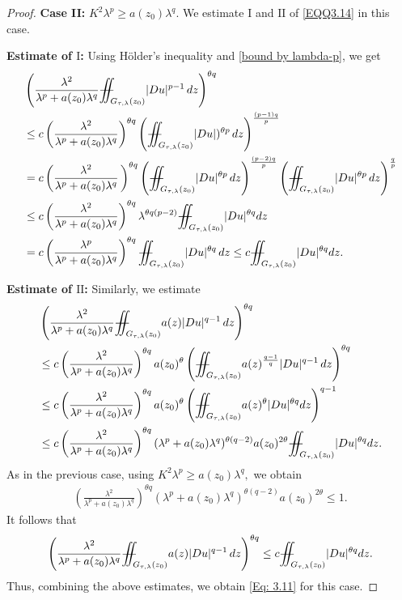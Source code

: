 \documentclass[notitlepage,11pt,reqno]{amsart}
\theoremstyle{definition}
\numberwithin{equation}{section}
\newcommand{\iintss}{{\int\hspace{-0.28cm}\int}}
\newcommand{ \miints }{{\iintss\hspace{-0.56cm} -\hspace{-0.15cm}-}}
\newcommand{\miint}[1]{{\miints_{\hspace{-0.13cm}#1}}}
\begin{document}
\begin{proof}
\noindent \textbf{Case II:} $K^2\lambda^p\geq a(z_0)\lambda^q$. We estimate $\mathrm{I}$ and $\mathrm{II}$ of \eqref{EQQ3.14} in this case. 

\noindent\textbf{Estimate of $\mathrm{I}$:} Using H\"{o}lder's inequality and \eqref{bound by lambda-p}, we get
\begin{align*}
&\left(\frac{\lambda^2}{\lambda^p+a(z_0)\lambda^q}\miint{G_{\tau, \lambda}(z_0)}|Du|^{p-1}\,dz\right)^{\theta q}\\
&\leq c\left(\frac{\lambda^2}{\lambda^p+a(z_0)\lambda^q}\right)^{\theta q}\left(\miint{G_{\tau, \lambda}(z_0)}|Du|)^{\theta p}\,dz\right)^{\frac{(p-1)q}{p}}\\
&=c\left(\frac{\lambda^2}{\lambda^p+a(z_0)\lambda^q}\,\right)^{\theta q}\left(\miint{G_{\tau, \lambda}(z_0)}|Du|^{\theta p}\,dz\right)^{\frac{(p-2)q}{p}}\left(\miint{G_{\tau, \lambda}(z_0)}|Du|^{\theta p}\,dz\right)^{\frac{q}{p}}\\
&\leq c\left(\frac{\lambda^2}{\lambda^p+a(z_0)\lambda^q}\right)^{\theta q}\lambda^{\theta q(p-2)} \miint{G_{\tau, \lambda}(z_0)}|Du|^{\theta q} dz\\
&=c\left(\frac{\lambda^p}{\lambda^p+a(z_0)\lambda^q}\right)^{\theta q} \miint{G_{\tau, \lambda}(z_0)}|Du|^{\theta q}\,dz\leq c\miint{G_{\tau, \lambda}(z_0)}|Du|^{\theta q} dz.
\end{align*}

\noindent \textbf{Estimate of $\mathrm{II}$:} Similarly, we estimate
\begin{align*}
&\left(\frac{\lambda^2}{\lambda^p+a(z_0)\lambda^q}\miint{G_{\tau, \lambda}(z_0)}a(z)|Du|^{q-1}\,dz\right)^{\theta q}\\
&\leq c\left(\frac{\lambda^2}{\lambda^p+a(z_0)\lambda^q}\right)^{\theta q}a(z_0)^{\theta}\left(\miint{G_{\tau, \lambda}(z_0)}a(z)^{\frac{q-1}{q}}|Du|^{q-1}\, dz\right)^{\theta q}\\
&\leq c \left(\frac{\lambda^2}{\lambda^p+a(z_0)\lambda^q}\right)^{\theta q}a(z_0)^{\theta}\left(\miint{G_{\tau, \lambda}(z_0)}a(z)^{\theta}|Du|^{\theta q}dz\right)^{q-1}\\
&\leq c \left(\frac{\lambda^2}{\lambda^p+a(z_0)\lambda^q}\right)^{\theta q}(\lambda^p+a(z_0)\lambda^q)^{\theta (q-2)}a(z_0)^{2\theta} \miint{G_{\tau, \lambda}(z_0)}|Du|^{\theta q}dz.
\end{align*}
As in the previous case, using $K^2\lambda^p\geq a(z_0)\lambda^q,$ we obtain
\begin{align*}
 \left(\frac{\lambda^2}{\lambda^p+a(z_0)\lambda^q}\right)^{\theta q}(\lambda^p+a(z_0)\lambda^q)^{\theta (q-2)}a(z_0)^{2\theta} \leq 1.   
\end{align*}
It follows that
\begin{align*}
    \left(\frac{\lambda^2}{\lambda^p+a(z_0)\lambda^q}\miint{G_{\tau, \lambda}(z_0)}a(z)|Du|^{q-1}\,dz\right)^{\theta q} \leq c \miint{G_{\tau, \lambda}(z_0)} |Du|^{\theta q} dz.
\end{align*}
Thus, combining the above estimates, we obtain \eqref{Eq: 3.11} for this case.
\end{proof}
\end{document}
